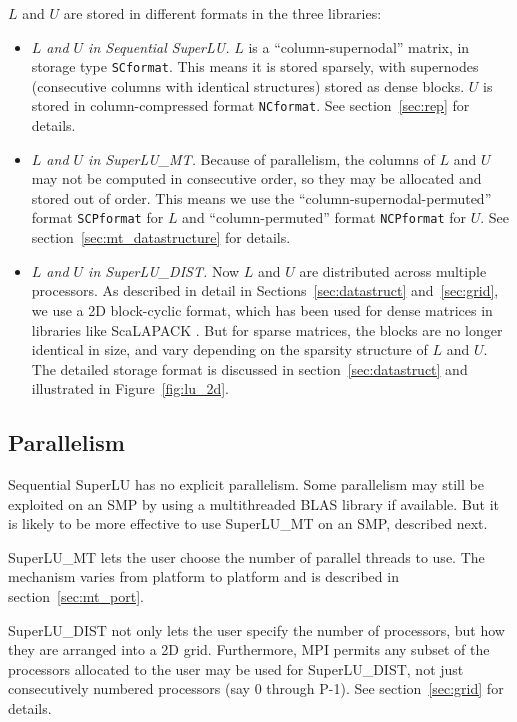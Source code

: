 $L$ and $U$ are stored in different formats in the three libraries:
\begin{itemize}
\item {\em $L$ and $U$ in Sequential SuperLU.}
$L$ is a ``column-supernodal'' matrix, in storage type {\tt SCformat}.
This means it is stored sparsely, with supernodes
(consecutive columns with identical structures)
stored as dense blocks.
$U$ is stored in column-compressed format {\tt NCformat}.
See section~\ref{sec:rep} for details.
\item {\em $L$ and $U$ in SuperLU\_MT.}
Because of parallelism, the columns of $L$ and $U$ may not
be computed in consecutive order, so they may be allocated
and stored out of order. This means we use the 
``column-supernodal-permuted'' format {\tt SCPformat} for $L$
and
``column-permuted'' format {\tt NCPformat} for $U$.
See section~\ref{sec:mt_datastructure} for details.
\item {\em $L$ and $U$ in SuperLU\_DIST.}
  Now $L$ and $U$ are distributed across multiple processors.
  As described in detail in Sections~\ref{sec:datastruct} and~\ref{sec:grid},
  we use a 2D block-cyclic format, which has been used for dense
  matrices in libraries like ScaLAPACK \cite{scalapackmanual}.
  But for sparse matrices, the blocks are no longer identical
  in size, and vary depending on the sparsity structure of 
  $L$ and $U$. The detailed storage format is discussed in
  section~\ref{sec:datastruct} and illustrated in 
  Figure~\ref{fig:lu_2d}.
\end{itemize}

\subsection{Parallelism}

Sequential SuperLU has no explicit parallelism. Some parallelism may
still be exploited on an SMP by using a multithreaded BLAS library
if available. But it is likely to be more effective to
use SuperLU\_MT on an SMP, described next.

SuperLU\_MT lets the user choose the number of parallel
threads to use. The mechanism varies from platform to
platform and is described in section~\ref{sec:mt_port}.

SuperLU\_DIST not only lets the user specify the number
of processors, but how they are arranged into a 2D grid.
Furthermore, MPI permits any subset of the processors allocated 
to the user may be used for SuperLU\_DIST, not just consecutively
numbered processors (say 0 through P-1).
See section~\ref{sec:grid} for details.

